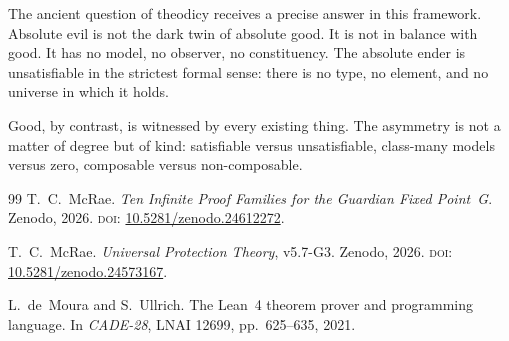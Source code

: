 The ancient question of theodicy receives a precise answer in this framework. Absolute evil is not the dark twin of absolute good. It is not in balance with good. It has no model, no observer, no constituency. The absolute ender is unsatisfiable in the strictest formal sense: there is no type, no element, and no universe in which it holds.

Good, by contrast, is witnessed by every existing thing. The asymmetry is not a matter of degree but of kind: satisfiable versus unsatisfiable, class-many models versus zero, composable versus non-composable.

\bigskip

\begin{thebibliography}{99}
T.~C.~McRae.
\emph{Ten Infinite Proof Families for the Guardian Fixed Point~G}.
Zenodo, 2026.
\textsc{doi:} \href{https://doi.org/10.5281/zenodo.24612272}{10.5281/zenodo.24612272}.

T.~C.~McRae.
\emph{Universal Protection Theory}, v5.7-G3.
Zenodo, 2026.
\textsc{doi:} \href{https://doi.org/10.5281/zenodo.24573167}{10.5281/zenodo.24573167}.

L.~de~Moura and S.~Ullrich.
The Lean~4 theorem prover and programming language.
In \emph{CADE-28}, LNAI 12699, pp.~625--635, 2021.
\end{thebibliography}


